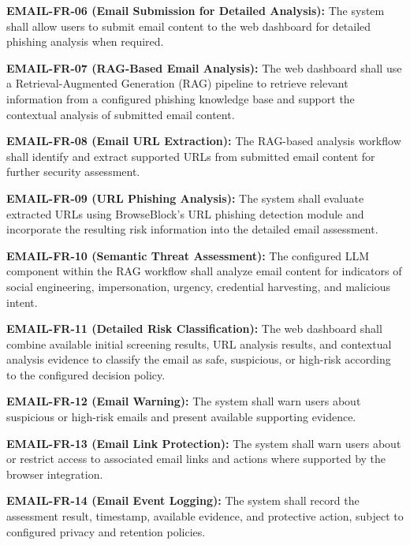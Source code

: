 \documentclass[12pt,a4paper]{report}
\begin{document}
\textbf{EMAIL-FR-06 (Email Submission for Detailed Analysis):} The system shall allow users to submit email content to the web dashboard for detailed phishing analysis when required.\par

\textbf{EMAIL-FR-07 (RAG-Based Email Analysis):} The web dashboard shall use a Retrieval-Augmented Generation (RAG) pipeline to retrieve relevant information from a configured phishing knowledge base and support the contextual analysis of submitted email content.\par

\textbf{EMAIL-FR-08 (Email URL Extraction):} The RAG-based analysis workflow shall identify and extract supported URLs from submitted email content for further security assessment.\par

\textbf{EMAIL-FR-09 (URL Phishing Analysis):} The system shall evaluate extracted URLs using BrowseBlock's URL phishing detection module and incorporate the resulting risk information into the detailed email assessment.\par

\textbf{EMAIL-FR-10 (Semantic Threat Assessment):} The configured LLM component within the RAG workflow shall analyze email content for indicators of social engineering, impersonation, urgency, credential harvesting, and malicious intent.\par

\textbf{EMAIL-FR-11 (Detailed Risk Classification):} The web dashboard shall combine available initial screening results, URL analysis results, and contextual analysis evidence to classify the email as safe, suspicious, or high-risk according to the configured decision policy.\par

\textbf{EMAIL-FR-12 (Email Warning):} The system shall warn users about suspicious or high-risk emails and present available supporting evidence.\par

\textbf{EMAIL-FR-13 (Email Link Protection):} The system shall warn users about or restrict access to associated email links and actions where supported by the browser integration.\par

\textbf{EMAIL-FR-14 (Email Event Logging):} The system shall record the assessment result, timestamp, available evidence, and protective action, subject to configured privacy and retention policies.\par
\end{document}
